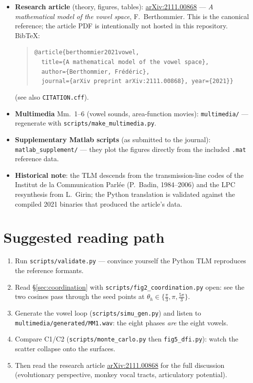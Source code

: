 \documentclass[11pt]{article}
\newcommand{\arxivpaper}{\href{https://arxiv.org/abs/2111.00868}{arXiv:2111.00868}}
\newcommand{\code}[1]{\texttt{#1}}
\theoremstyle{definition}
\theoremstyle{remark}
\begin{document}
\begin{itemize}[nosep]
\item \textbf{Research article} (theory, figures, tables):
      \arxivpaper{} --- \emph{A mathematical model of the vowel space},
      F.~Berthommier.  This is the canonical reference; the article PDF
      is intentionally not hosted in this repository.
      BibTeX:
      \begin{quote}\small
      \code{@article\{berthommier2021vowel,}\\
      \code{~~title=\{A mathematical model of the vowel space\},}\\
      \code{~~author=\{Berthommier, Fr\'ed\'eric\},}\\
      \code{~~journal=\{arXiv preprint arXiv:2111.00868\}, year=\{2021\}\}}
      \end{quote}
      (see also \code{CITATION.cff}).
\item \textbf{Multimedia} Mm.~1--6 (vowel sounds, area-function movies):
      \code{multimedia/} --- regenerate with
      \code{scripts/make\_multimedia.py}.
\item \textbf{Supplementary Matlab scripts} (as submitted to the
      journal): \code{matlab\_supplement/} --- they plot the figures
      directly from the included \code{.mat} reference data.
\item \textbf{Historical note}: the TLM descends from the transmission-line
      codes of the Institut de la Communication Parl\'ee (P.~Badin,
      1984--2006) and the LPC resynthesis from L.~Girin; the Python
      translation is validated against the compiled 2021 binaries that
      produced the article's data.
\end{itemize}

\section{Suggested reading path}

\begin{enumerate}[nosep]
\item Run \code{scripts/validate.py} --- convince yourself the Python TLM
      reproduces the reference formants.
\item Read \S\ref{sec:coordination} with
      \code{scripts/fig2\_coordination.py} open: see the two cosines pass
      through the seed points at $\theta_h\in\{\frac{\pi}{3},\pi,
      \frac{5\pi}{3}\}$.
\item Generate the vowel loop (\code{scripts/simu\_gen.py}) and listen to
      \code{multimedia/generated/MM1.wav}: the eight phases
      \emph{are} the eight vowels.
\item Compare C1/C2 (\code{scripts/monte\_carlo.py} then
      \code{fig5\_dfi.py}): watch the scatter collapse onto the surfaces.
\item Then read the research article \arxivpaper{} for the full
      discussion (evolutionary perspective, monkey vocal tracts,
      articulatory potential).
\end{enumerate}
\end{document}
